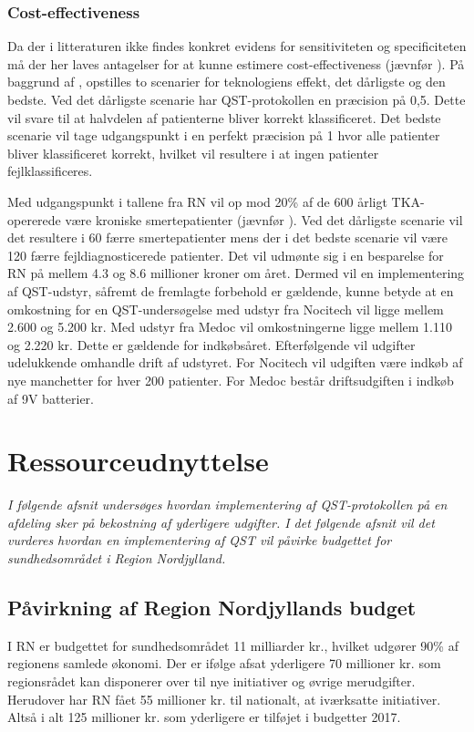 \subsubsection{Cost-effectiveness}
Da der i litteraturen ikke findes konkret evidens for sensitiviteten og specificiteten må der her laves antagelser for at kunne estimere cost-effectiveness (jævnfør ). På baggrund af , opstilles to scenarier for teknologiens effekt, det dårligste og den bedste. Ved det dårligste scenarie har QST-protokollen en præcision på 0,5. Dette vil svare til at halvdelen af patienterne bliver korrekt klassificeret. Det bedste scenarie vil tage udgangspunkt i en perfekt præcision på 1 hvor alle patienter bliver klassificeret korrekt, hvilket vil resultere i at ingen patienter fejlklassificeres.  

Med udgangspunkt i tallene fra RN vil op mod 20\% af de 600 årligt TKA-opererede være kroniske smertepatienter (jævnfør ). Ved det dårligste scenarie vil det resultere i 60 færre smertepatienter mens der i det bedste scenarie vil være 120 færre fejldiagnosticerede patienter. Det vil udmønte sig i en besparelse for RN på mellem 4.3 og 8.6 millioner kroner om året. Dermed vil en implementering af QST-udstyr, såfremt de fremlagte forbehold er gældende, kunne betyde at en omkostning for en QST-undersøgelse med udstyr fra Nocitech vil ligge mellem 2.600 og 5.200 kr. Med udstyr fra Medoc vil omkostningerne ligge mellem 1.110 og 2.220 kr. Dette er gældende for indkøbsåret. Efterfølgende vil udgifter udelukkende omhandle drift af udstyret. For Nocitech vil udgiften være indkøb af nye manchetter for hver 200 patienter. For Medoc består driftsudgiften i indkøb af 9V batterier. 

\section{Ressourceudnyttelse}
\textit{I følgende afsnit undersøges hvordan implementering af QST-protokollen på en afdeling sker på bekostning af yderligere udgifter. I det følgende afsnit vil det vurderes hvordan en implementering af QST vil påvirke budgettet for sundhedsområdet i Region Nordjylland.}

\subsection{Påvirkning af Region Nordjyllands budget}
I RN er budgettet for sundhedsområdet 11 milliarder kr., hvilket udgører 90\% af regionens samlede økonomi. \citep{RnBudget17}  Der er ifølge  afsat yderligere 70 millioner kr. som regionsrådet kan disponerer over til nye initiativer og øvrige merudgifter. Herudover har RN fået 55 millioner kr. til nationalt, at iværksatte initiativer. Altså i alt 125 millioner kr. som yderligere er tilføjet i budgetter 2017.

